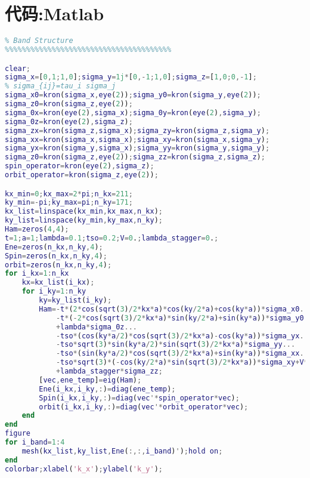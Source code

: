 \section{代码:Matlab}\label{sec:code}
\begin{lstlisting}[language=matlab]
%%%%%%%%%%%%%%%%%%%%%%%%%%%%%%%%%%%%%%%
% Band Structure
%%%%%%%%%%%%%%%%%%%%%%%%%%%%%%%%%%%%%%%

clear;
sigma_x=[0,1;1,0];sigma_y=1j*[0,-1;1,0];sigma_z=[1,0;0,-1];
% sigma_{ij}=tau_i sigma_j
sigma_x0=kron(sigma_x,eye(2));sigma_y0=kron(sigma_y,eye(2));
sigma_z0=kron(sigma_z,eye(2));
sigma_0x=kron(eye(2),sigma_x);sigma_0y=kron(eye(2),sigma_y);
sigma_0z=kron(eye(2),sigma_z);
sigma_zx=kron(sigma_z,sigma_x);sigma_zy=kron(sigma_z,sigma_y);
sigma_xx=kron(sigma_x,sigma_x);sigma_xy=kron(sigma_x,sigma_y);
sigma_yx=kron(sigma_y,sigma_x);sigma_yy=kron(sigma_y,sigma_y);
sigma_z0=kron(sigma_z,eye(2));sigma_zz=kron(sigma_z,sigma_z);
spin_operator=kron(eye(2),sigma_z);
orbit_operator=kron(sigma_z,eye(2));

kx_min=0;kx_max=2*pi;n_kx=211;
ky_min=-pi;ky_max=pi;n_ky=171;
kx_list=linspace(kx_min,kx_max,n_kx);
ky_list=linspace(ky_min,ky_max,n_ky);
Ham=zeros(4,4);
t=1;a=1;lambda=0.1;tso=0.2;V=0.;lambda_stagger=0.;
Ene=zeros(n_kx,n_ky,4);
Spin=zeros(n_kx,n_ky,4);
orbit=zeros(n_kx,n_ky,4);
for i_kx=1:n_kx
    kx=kx_list(i_kx);
    for i_ky=1:n_ky
        ky=ky_list(i_ky);
        Ham=-t*(2*cos(sqrt(3)/2*kx*a)*cos(ky/2*a)+cos(ky*a))*sigma_x0...
            -t*(-2*cos(sqrt(3)/2*kx*a)*sin(ky/2*a)+sin(ky*a))*sigma_y0...
            +lambda*sigma_0z...
            -tso*(cos(ky*a/2)*cos(sqrt(3)/2*kx*a)-cos(ky*a))*sigma_yx...
            -tso*sqrt(3)*sin(ky*a/2)*sin(sqrt(3)/2*kx*a)*sigma_yy...
            -tso*(sin(ky*a/2)*cos(sqrt(3)/2*kx*a)+sin(ky*a))*sigma_xx...
            -tso*sqrt(3)*(-cos(ky/2*a)*sin(sqrt(3)/2*kx*a))*sigma_xy+V*sigma_z0...
            +lambda_stagger*sigma_zz;
        [vec,ene_temp]=eig(Ham);
        Ene(i_kx,i_ky,:)=diag(ene_temp);
        Spin(i_kx,i_ky,:)=diag(vec'*spin_operator*vec);
        orbit(i_kx,i_ky,:)=diag(vec'*orbit_operator*vec);
    end
end
figure
for i_band=1:4
    mesh(kx_list,ky_list,Ene(:,:,i_band)');hold on;
end
colorbar;xlabel('k_x');ylabel('k_y');


\end{lstlisting}
